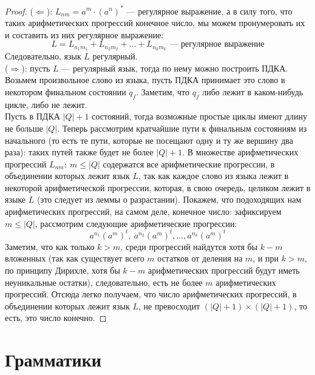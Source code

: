 \documentclass[11pt]{article}
\begin{document}
\begin{proof}
    ($\Longleftarrow$): $L_{nm} = a^m \cdot (a^n)^*$ --- регулярное выражение, а в силу того, что таких арифметических прогрессий конечное число, мы можем пронумеровать их 
    и составить из них регулярное выражение: \[L = L_{n_1 m_1} + L_{n_2 m_2} + \dots + L_{n_k m_k} \text{ --- регулярное выражение}\] Следовательно, язык $L$ регулярный.\\
    \leavevmode
    ($\Longrightarrow$): пусть $L$ --- регулярный язык, тогда по нему можно построить ПДКА. Возьмем произвольное слово из языка, пусть ПДКА принимает это слово в некотором
    финальном состоянии $q_f$. Заметим, что $q_f$ либо лежит в каком-нибудь цикле, либо не лежит.\\
    Пусть в ПДКА $\left|Q\right| + 1$ состояний, тогда возможные простые циклы имеют длину не больше $\left|Q\right|$. Теперь рассмотрим кратчайшие пути к финальным состояниям
    из начального (то есть те пути, которые не посещают одну и ту же вершину два раза): таких путей также будет не более $\left|Q\right| + 1$. В множестве арифметических прогрессий
    $L_{nm}: \ m \leq \left|Q\right|$ содержатся все арифметические прогрессии, в объединении которых лежит язык $L$, так как каждое слово из языка лежит в некоторой 
    арифметической прогрессии, которая, в свою очередь, целиком лежит в языке $L$ (это следует из леммы о разрастании). Покажем, что подоходящих нам арифметических прогрессий,
    на самом деле, конечное число: зафиксируем $m \leq \left|Q\right|$, рассмотрим следующие арифметические прогрессии: \[a^{n_1} (a^m)^t, \ a^{n_2} (a^m)^t, \dots, a^{n_k} (a^m)^t\]
    Заметим, что как только $k > m$, среди прогрессий найдутся хотя бы $k-m$ вложенных (так как существует всего $m$ остатков от деления на $m$, и при $k > m$, по принципу Дирихле, хотя бы 
    $k - m$ арифметических прогрессий будут иметь неуникальные остатки), следовательно, есть не более $m$ арифметических прогрессий. Отсюда легко получаем, что число арифметических 
    прогрессий, в объединении которых лежит язык $L$, не превосходит $(\left|Q\right| + 1) \times (\left|Q\right| + 1)$, то есть, это число конечно.

\end{proof}

\section{Грамматики}
\end{document}
